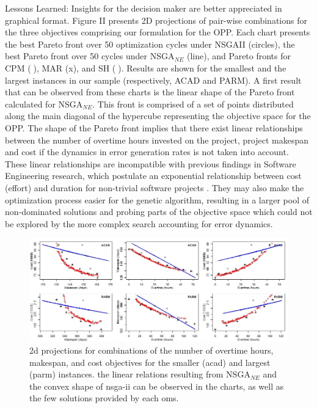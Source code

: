 \documentclass[conference]{IEEEtran}
\begin{document}
Lessons Learned: Insights for the decision maker are better appreciated in graphical format. Figure II presents 2D projections of pair-wise combinations for the three objectives comprising our formulation for the OPP. Each chart presents the best Pareto front over 50 optimization cycles under NSGAII (circles), the best Pareto front over 50 cycles under NSGA$_{NE}$ (line), and Pareto fronts for CPM (), MAR (x), and SH (). Results are shown for the smallest and the largest instances in our sample (respectively, ACAD and PARM).
A first result that can be observed from these charts is the linear shape of the Pareto front calculated for NSGA$_{NE}$. This front is comprised of a set of points distributed along the main diagonal of the hypercube representing the objective space for the OPP. The shape of the Pareto front implies that there exist linear relationships between the number of overtime hours invested on the project, project makespan and cost if the dynamics in error generation rates is not taken into account. These linear relationships are incompatible with previous findings in Software Engineering research, which postulate an exponential relationship between cost (effort) and duration for non-trivial software projects \cite{Boehm:1981}. They may also make the optimization process easier for the genetic algorithm, resulting in a larger pool of non-dominated solutions and probing parts of the objective space which could not be explored by the more complex search accounting for error dynamics.


\begin{figure}
\centering
\includegraphics[width=18cm]{lessonslearned.jpg}
\caption{2d projections for combinations of the number of overtime hours, makespan, and cost objectives for the smaller (acad) and largest (parm) instances. the linear relations resulting from NSGA$_{NE}$ and the convex shape of nsga-ii can be observed in the charts, as well as the few solutions provided by each oms.}
\end{figure}
\end{document}
